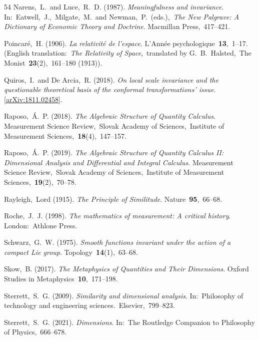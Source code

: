 \documentclass[12pt]{article}
\numberwithin{equation}{section}
\begin{document}
\begin{small}
\begin{thebibliography}{54}
{Narens,~L.~and Luce,~R.~D.} (1987).
{\em Meaningfulness and invariance}.
In:~Eatwell,~J.,~Milgate,~M.~and Newman,~P.~(eds.),~{\em The New Palgrave: A Dictionary of Economic Theory and Doctrine}.
Macmillan Press,~417--421.

{Poincar\'e,~H.} (1906).
{\em La relativit\'e de l'espace}.
L'Ann\'ee psychologique~\textbf{13},~1--17.
(English translation:~{\em The Relativity of Space},~translated by G.~B.~Halsted,~The Monist~\textbf{23}(2),~161--180 (1913)).

{Quiros,~I.~and De Arcia,~R.} (2018).
{\em On local scale invariance and the questionable theoretical basis of the conformal transformations' issue}.
[\href{https://arxiv.org/abs/1811.02458}{arXiv:1811.02458}].

{Raposo,~\'A.~P.} (2018).
{\em The Algebraic Structure of Quantity Calculus}.
Measurement Science Review,~Slovak Academy of Sciences,~Institute of Measurement Sciences,~\textbf{18}(4),~147--157.

{Raposo,~\'A.~P.} (2019).
{\em The Algebraic Structure of Quantity Calculus II: Dimensional Analysis and Differential and Integral Calculus}.
Measurement Science Review,~Slovak Academy of Sciences,~Institute of Measurement Sciences,~\textbf{19}(2),~70--78.

{Rayleigh,~Lord} (1915).
{\em The Principle of Similitude}.
Nature~\textbf{95},~66--68.

{Roche,~J.~J.} (1998).
{\em The mathematics of measurement: A critical history}.
London:~Athlone Press.

{Schwarz,~G.~W.} (1975).
{\em Smooth functions invariant under the action of a compact Lie group}.
Topology~\textbf{14}(1),~63--68.

{Skow,~B.} (2017).
{\em The Metaphysics of Quantities and Their Dimensions}.
Oxford Studies in Metaphysics~\textbf{10},~171--198.

{Sterrett,~S.~G.} (2009).
{\em Similarity and dimensional analysis}.
In:~Philosophy of technology and engineering sciences.~Elsevier,~799--823.

{Sterrett,~S.~G.} (2021).
{\em Dimensions}.
In:~The Routledge Companion to Philosophy of Physics,~666--678.


\end{thebibliography}
\end{small}
\end{document}
